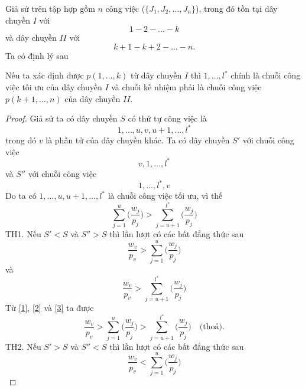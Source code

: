Giả sử trên tập hợp gồm $n$ công việc ($\{J_1, J_2, …, J_n\}$), trong đó tồn tại dây chuyền $I$ với
\begin{equation*}
1 - 2 - \ldots - k
\end{equation*}
và dây chuyền $II$ với
\begin{equation*}
k+1 - k+2 - \ldots - n.
\end{equation*}
Ta có định lý sau
\begin{dl}
	Nếu ta xác định được $p(1,\ldots,k)$ từ dây chuyền $I$ thì $1,\ldots,l^*$ chính là chuỗi công việc tối ưu của dây chuyền $I$ và chuỗi kế nhiệm phải là chuỗi công việc $p(k+1,\ldots,n)$ của dây chuyền $II$. 
\end{dl}

\begin{proof}
	Giả sử ta có dây chuyền $S$ có thứ tự công việc là 
	\begin{equation*}
	1,\ldots,u,v,u+1,\ldots,l^*
	\end{equation*}
	trong đó $v$ là phần tử của dây chuyền khác.
	Ta có dây chuyền $S'$ với chuỗi công việc
	\begin{equation*}
		v,1,\ldots,l^*
	\end{equation*}
	và $S''$ với chuỗi công việc
	\begin{equation*}
		1,\ldots,l^*,v
	\end{equation*}
	Do ta có $1,\ldots,u,u+1,\ldots,l^*$ là chuỗi công việc tối ưu, vì thế
	\begin{equation} \label{1}
		\sum_{j=1}^{u}\biggl(\frac{w_j}{p_j}\biggl) > \sum_{j=u+1}^{l^*}\biggl(\frac{w_j}{p_j}\biggl)
	\end{equation}
	TH1.
	Nếu $S' < S$ và $S''>S$ thì lần lượt có các bất đẳng thức sau
	\begin{equation} \label{2}
		\frac{w_v}{p_v} > \sum_{j=1}^{u}\biggl(\frac{w_j}{p_j}\biggr)
	\end{equation}
	và
	\begin{equation} \label{3}
		\frac{w_v}{p_v} > \sum_{j=u+1}^{l^*}\biggl(\frac{w_j}{p_j}\biggr)
	\end{equation}
	Từ \eqref{1}, \eqref{2} và \eqref{3} ta được
	\begin{equation}
		\frac{w_v}{p_v} > \sum_{j=1}^{u}\biggl(\frac{w_j}{p_j}\biggl) > \sum_{j=u+1}^{l^*}\biggl(\frac{w_j}{p_j}\biggl) \quad \text{(thoả).}
	\end{equation}
	TH2.
	Nếu $S' > S$ và $S'' < S$ thì lần lượt có các bất đẳng thức sau
	\begin{equation} \label{4}
		\frac{w_v}{p_v} < \sum_{j=1}^{u}\biggl(\frac{w_j}{p_j}\biggr)

\end{equation}
\end{proof}
